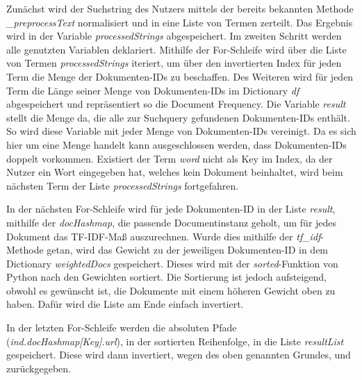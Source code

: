 Zunächst wird der Suchstring des Nutzers mittels der bereits bekannten Methode \textit{\_preprocessText} normalisiert und in eine Liste von Termen zerteilt. Das Ergebnis wird in der Variable \textit{processedStrings} abgespeichert. Im zweiten Schritt werden alle genutzten Variablen deklariert. Mithilfe der For-Schleife wird über die Liste von Termen \textit{processedStrings} iteriert, um über den invertierten Index für jeden Term die Menge der Dokumenten-IDs zu beschaffen. Des Weiteren wird für jeden Term die Länge seiner Menge von Dokumenten-IDs im Dictionary \textit{df} abgespeichert und repräsentiert so die Document Frequency. Die Variable \textit{result} stellt die Menge da, die alle zur Suchquery gefundenen Dokumenten-IDs enthält. So wird diese Variable mit jeder Menge von Dokumenten-IDs vereinigt. Da es sich hier um eine Menge handelt kann ausgeschlossen werden, dass Dokumenten-IDs doppelt vorkommen. Existiert der Term \textit{word} nicht als Key im Index, da der Nutzer ein Wort eingegeben hat, welches kein Dokument beinhaltet, wird beim nächsten Term der Liste \emph{processedStrings} fortgefahren.

In der nächsten For-Schleife wird für jede Dokumenten-ID in der Liste \textit{result}, mithilfe der \textit{docHashmap}, die passende Documentinstanz geholt, um für jedes Dokument das TF-IDF-Maß auszurechnen. Wurde dies mithilfe der \textit{tf\_idf}-Methode getan, wird das Gewicht zu der jeweiligen Dokumenten-ID in dem Dictionary \textit{weightedDocs} gespeichert. Dieses wird mit der \textit{sorted}-Funktion von Python nach den Gewichten sortiert. Die Sortierung ist jedoch aufsteigend, obwohl es gewünscht  ist, die Dokumente mit einem höheren Gewicht oben zu haben. Dafür wird die Liste am Ende einfach invertiert.

In der letzten For-Schleife werden die absoluten Pfade (\textit{ind.docHashmap[Key].url}), in der sortierten Reihenfolge, in die Liste \textit{resultList} gespeichert. Diese wird dann invertiert, wegen des oben genannten Grundes, und zurückgegeben.


